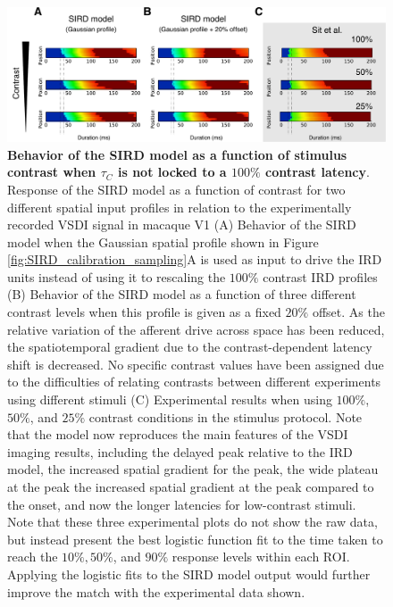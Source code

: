 \documentclass[phd,ianc,twoside]{infthesis}
\begin{document}
\begin{figure}
\center
\includegraphics[width=1\textwidth]{./figures/sird_calibration_latency_contrast.pdf}
\caption{{\bf Behavior of the SIRD model as a function of stimulus
    contrast when $\tau_C$ is not locked to a $100\%$ contrast
    latency}. Response of the SIRD model as a function of contrast for
  two different spatial input profiles in relation to the experimentally
  recorded VSDI signal in macaque V1 \citet{sit_neuron09} (A) Behavior
  of the SIRD model when the Gaussian spatial profile shown in Figure
  \ref{fig:SIRD_calibration_sampling}A is used as input to drive the IRD
  units instead of using it to rescaling the $100\%$ contrast IRD
  profiles (B) Behavior of the SIRD model as a function of three
  different contrast levels when this profile is given as a fixed $20\%$
  offset. As the relative variation of the afferent drive across space
  has been reduced, the spatiotemporal gradient due to the
  contrast-dependent latency shift is decreased. No specific contrast
  values have been assigned due to the difficulties of relating
  contrasts between different experiments using different stimuli (C)
  Experimental results when using $100\%$, $50\%$, and $25\%$ contrast
  conditions in the \citet{sit_neuron09} stimulus protocol.  Note that
  the model now reproduces the main features of the VSDI imaging
  results, including the delayed peak relative to the IRD model, the
  increased spatial gradient for the peak, the wide plateau at the peak
  the increased spatial gradient at the peak compared to the onset, and
  now the longer latencies for low-contrast stimuli.  Note that these
  three experimental plots do not show the raw data, but instead present
  the best logistic function fit to the time taken to reach the $10\%,
  50\%$, and $90\%$ response levels within each ROI. Applying the
  logistic fits to the SIRD model output would further improve the match
  with the experimental data shown.}
\label{fig:sird_calibration_contrast}
\end{figure}
\end{document}
